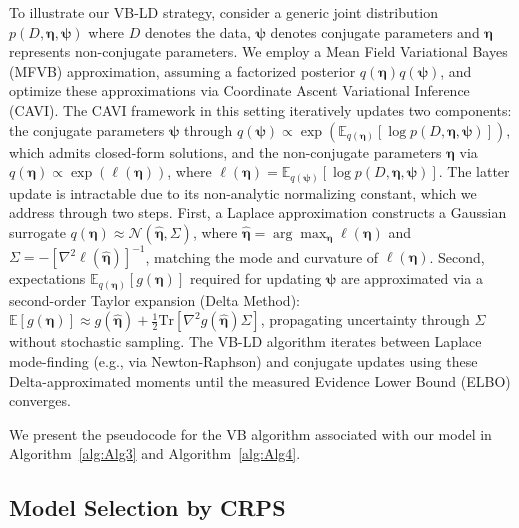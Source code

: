 \documentclass[APA,STIX1COL]{WileyNJD-v2}
\begin{document}
To illustrate our VB-LD strategy, consider a generic joint distribution \( p(D,\boldsymbol{\eta}, \boldsymbol{\psi}) \) where $D$ denotes the data, \( \boldsymbol{\psi} \) denotes conjugate parameters and \( \boldsymbol{\eta} \) represents non-conjugate parameters. We employ a Mean Field Variational Bayes (MFVB) approximation, assuming a factorized posterior \( q(\boldsymbol{\eta})q(\boldsymbol{\psi}) \), and optimize these approximations via Coordinate Ascent Variational Inference (CAVI). The CAVI framework in this setting iteratively updates two components: the conjugate parameters \( \boldsymbol{\psi} \) through \( q(\boldsymbol{\psi}) \propto \exp\left(\mathbb{E}_{q(\boldsymbol{\eta})}[\log p(D, \boldsymbol{\eta}, \boldsymbol{\psi})]\right) \), which admits closed-form solutions, and the non-conjugate parameters \( \boldsymbol{\eta} \) via \( q(\boldsymbol{\eta}) \propto \exp(\ell(\boldsymbol{\eta})) \), where \( \ell(\boldsymbol{\eta}) = \mathbb{E}_{q(\boldsymbol{\psi})}[\log p(D, \boldsymbol{\eta}, \boldsymbol{\psi})] \). The latter update is intractable due to its non-analytic normalizing constant, which we address through two steps. First, a Laplace approximation constructs a Gaussian surrogate \( q(\boldsymbol{\eta}) \approx \mathcal{N}(\hat{\boldsymbol{\eta}}, \Sigma) \), where \( \hat{\boldsymbol{\eta}} = \arg\max_{\boldsymbol{\eta}} \ell(\boldsymbol{\eta}) \) and \( \Sigma = -\left[\nabla^2 \ell(\hat{\boldsymbol{\eta}})\right]^{-1} \), matching the mode and curvature of \( \ell(\boldsymbol{\eta}) \). Second, expectations \( \mathbb{E}_{q(\boldsymbol{\eta})}[g(\boldsymbol{\eta})] \) required for updating \( \boldsymbol{\psi} \) are approximated via a second-order Taylor expansion (Delta Method): \( \mathbb{E}[g(\boldsymbol{\eta})] \approx g(\hat{\boldsymbol{\eta}}) + \frac{1}{2}\text{Tr}\left[\nabla^2 g(\hat{\boldsymbol{\eta}}) \Sigma\right] \), propagating uncertainty through \( \Sigma \) without stochastic sampling. The VB-LD algorithm iterates between Laplace mode-finding (e.g., via Newton-Raphson) and conjugate updates using these Delta-approximated moments until the measured Evidence Lower Bound (ELBO) converges.

We present the pseudocode for the VB algorithm associated with our model in Algorithm~\ref{alg:Alg3} and Algorithm~\ref{alg:Alg4}.

\subsection{Model Selection by CRPS}
\label{subsec:modelselection}
\end{document}
